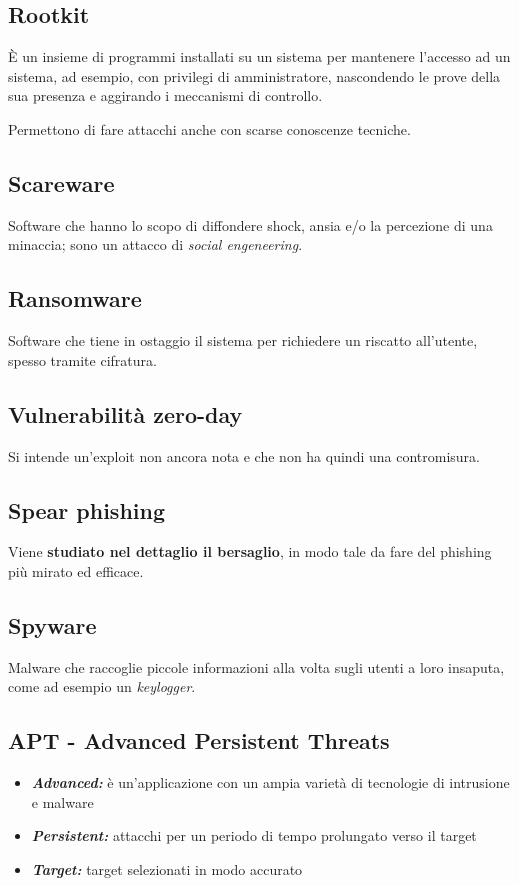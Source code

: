 \documentclass{report}
\begin{document}
\subsection{Rootkit}
È un insieme di programmi installati su un sistema per mantenere l'accesso ad un sistema, ad 
esempio, con privilegi di amministratore, nascondendo le prove della sua presenza e aggirando 
i meccanismi di controllo.

\noindent Permettono di fare attacchi anche con scarse conoscenze tecniche.

\subsection{Scareware}
Software che hanno lo scopo di diffondere shock, ansia e/o la percezione di una minaccia; sono 
un attacco di \textit{social engeneering}.

\subsection{Ransomware}
Software che tiene in ostaggio il sistema per richiedere un riscatto all'utente, spesso tramite
cifratura.

\subsection{Vulnerabilità zero-day}
Si intende un'exploit non ancora nota e che non ha quindi una contromisura.

\subsection{Spear phishing}
Viene \textbf{studiato nel dettaglio il bersaglio}, in modo tale da fare del phishing più mirato 
ed efficace.

\subsection{Spyware}
Malware che raccoglie piccole informazioni alla volta sugli utenti a loro insaputa,
come ad esempio un \textit{keylogger}.

\subsection{APT - Advanced Persistent Threats}
\begin{itemize}
    \item \textit{\textbf{Advanced:}} è un'applicazione con un ampia varietà di tecnologie di intrusione e malware
    \item \textit{\textbf{Persistent:}}
    attacchi per un periodo di tempo prolungato verso il target
    \item \textit{\textbf{Target:}} target selezionati in modo accurato
\end{itemize}
\end{document}
